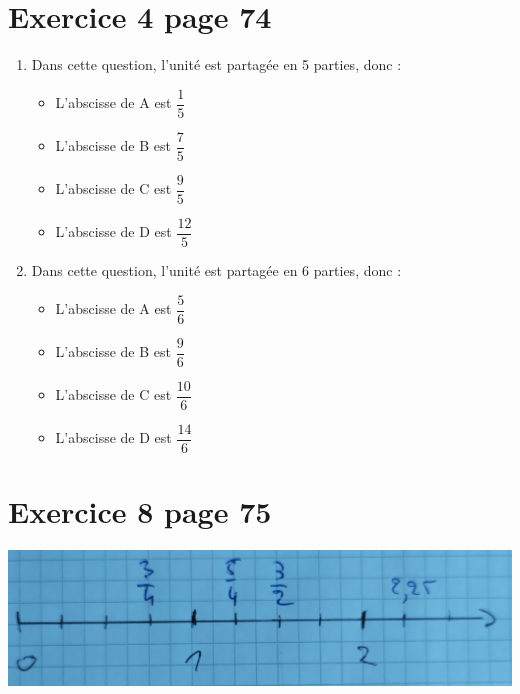 \documentclass[12pt,a4paper]{article}
\begin{document}
\section{Exercice 4 page 74}

\begin{enumerate}
	\item Dans cette question, l'unité est partagée en 5 parties,  donc :
	
	\begin{multicols}{2}
		\begin{itemize}
			\item L'abscisse de A est $\dfrac{1}{5}$
			\item L'abscisse de B est $\dfrac{7}{5}$
			\item L'abscisse de C est $\dfrac{9}{5}$
			\item L'abscisse de D est $\dfrac{12}{5}$
			
		\end{itemize}
	\end{multicols}
	

	\item Dans cette question, l'unité est partagée en 6 parties,  donc :
	
	\begin{multicols}{2}
			\begin{itemize}
				\item L'abscisse de A est $\dfrac{5}{6}$
				\item L'abscisse de B est $\dfrac{9}{6}$
				\item L'abscisse de C est $\dfrac{10}{6}$
				\item L'abscisse de D est $\dfrac{14}{6}$
				
			\end{itemize}
	\end{multicols}
	
\end{enumerate}

\section{Exercice 8 page 75}

\includegraphics[scale=0.17]{img/ex8}
\end{document}
